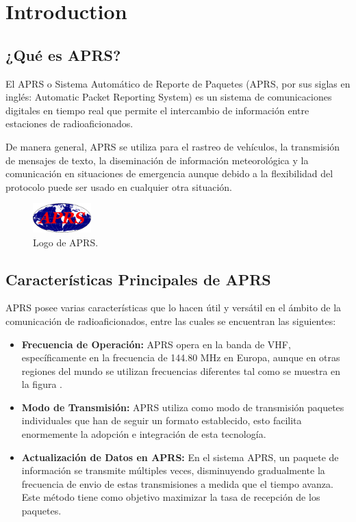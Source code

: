 \chapter*{Introduction}
\label{cap:introduction}

\section{¿Qué es APRS?}

El APRS o Sistema Automático de Reporte de Paquetes (APRS, por sus siglas en inglés: Automatic Packet Reporting System) es un sistema de comunicaciones digitales en tiempo real que permite el intercambio de información entre estaciones de radioaficionados.

De manera general, APRS se utiliza para el rastreo de vehículos, la transmisión de mensajes de texto, la diseminación de información meteorológica y la comunicación en situaciones de emergencia aunque debido a la flexibilidad del protocolo puede ser usado en cualquier otra situación.

\begin{figure}[h!]
	\centering
	\includegraphics[width=0.2\textwidth]{Imagenes/Chapter_1/APRS_logo.png}
	\caption{Logo de APRS.}
	\label{fig:aprs-logo}
\end{figure}

\section{Características Principales de APRS}

APRS posee varias características que lo hacen útil y versátil en el ámbito de la comunicación de radioaficionados, entre las cuales se encuentran las siguientes:
\begin{itemize}
	\item \textbf{Frecuencia de Operación:} APRS opera en la banda de VHF, específicamente en la frecuencia de 144.80 MHz en Europa, aunque en otras regiones del mundo se utilizan frecuencias diferentes tal como se muestra en la figura .
	\item \textbf{Modo de Transmisión:} APRS utiliza como modo de transmisión paquetes individuales que han de seguir un formato establecido, esto facilita enormemente la adopción e integración de esta tecnología.
	\item \textbf{Actualización de Datos en APRS:} En el sistema APRS, un paquete de información se transmite múltiples veces, disminuyendo gradualmente la frecuencia de envio de estas transmisiones a medida que el tiempo avanza. Este método tiene como objetivo maximizar la tasa de recepción de los paquetes.
\end{itemize}


